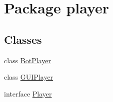 \hypertarget{namespaceplayer}{}\section{Package player}
\label{namespaceplayer}
\subsection*{Classes}
\begin{DoxyCompactItemize}
\item 
class \mbox{\hyperlink{classplayer_1_1_bot_player}{Bot\+Player}}
\item 
class \mbox{\hyperlink{classplayer_1_1_g_u_i_player}{G\+U\+I\+Player}}
\item 
interface \mbox{\hyperlink{interfaceplayer_1_1_player}{Player}}
\end{DoxyCompactItemize}
